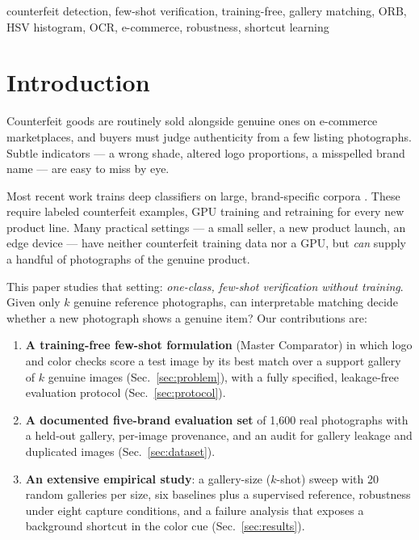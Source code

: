 \documentclass[conference]{IEEEtran}
\begin{document}
\begin{IEEEkeywords}
counterfeit detection, few-shot verification, training-free, gallery
matching, ORB, HSV histogram, OCR, e-commerce, robustness, shortcut learning
\end{IEEEkeywords}

\section{Introduction}
\label{sec:intro}

Counterfeit goods are routinely sold alongside genuine ones on e-commerce
marketplaces, and buyers must judge authenticity from a few listing
photographs. Subtle indicators --- a wrong shade, altered logo
proportions, a misspelled brand name --- are easy to miss by eye.

Most recent work trains deep classifiers on large, brand-specific corpora
\cite{footwear2024,fakelogo2024}. These require labeled counterfeit
examples, GPU training and retraining for every new product line. Many
practical settings --- a small seller, a new product launch, an edge
device --- have neither counterfeit training data nor a GPU, but
\emph{can} supply a handful of photographs of the genuine product.

This paper studies that setting: \emph{one-class, few-shot verification
without training}. Given only $k$ genuine reference photographs, can
interpretable matching decide whether a new photograph shows a genuine
item? Our contributions are:

\begin{enumerate}
    \item \textbf{A training-free few-shot formulation} (Master Comparator)
    in which logo and color checks score a test image by its best match
    over a support gallery of $k$ genuine images (Sec.~\ref{sec:problem}),
    with a fully specified, leakage-free evaluation protocol
    (Sec.~\ref{sec:protocol}).
    \item \textbf{A documented five-brand evaluation set} of 1{,}600 real
    photographs with a held-out gallery, per-image provenance, and an
    audit for gallery leakage and duplicated images (Sec.~\ref{sec:dataset}).
    \item \textbf{An extensive empirical study}: a gallery-size ($k$-shot)
    sweep with 20 random galleries per size, six baselines plus a
    supervised reference, robustness under eight capture conditions, and a
    failure analysis that exposes a background shortcut in the color cue
    (Sec.~\ref{sec:results}).
\end{enumerate}
\end{document}

